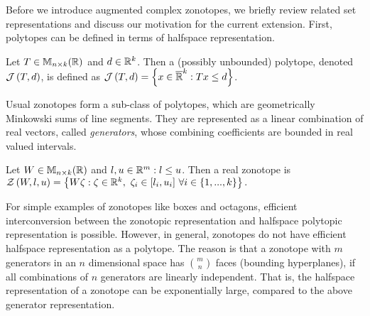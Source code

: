 
Before we introduce augmented complex zonotopes, we briefly review
related set representations and discuss our motivation for the
current extension. First, polytopes can be defined in terms of halfspace representation.
%
\begin{definition}
Let $T\in\mathbb{M}_{n\times k}(\mathbb{\mathbb{R}})$ and $d\in\mathbb{R}^k$.  Then a (possibly
unbounded) polytope, denoted $\mathcal{J}\left(T,d\right)$, is defined as
$\mathcal{J}\left(T,d\right) = \left\{x\in\mathbb{\overline{R}}^k: Tx\leq d\right\}$.
\end{definition}
%
Usual zonotopes form a sub-class of polytopes, which are geometrically
Minkowski sums of line segments. They are represented as a linear
combination of real vectors, called \emph{generators}, whose combining
coefficients are bounded in real valued intervals.
\begin{definition}
Let $W\in\mathbb{M}_{n\times k}(\mathbb{\mathbb{R}})$ and $l,u\in\mathbb{R}^m: l\leq u$.  Then 
 a real zonotope is
$\mathcal{Z}\left(W,l,u\right) = \left\{W\zeta: \zeta\in\mathbb{R}^k,~\zeta_i\in[l_i,u_i]~\forall i\in \{1,...,k\}\right\}.$
\end{definition}
%
For simple examples of zonotopes like boxes and octagons, efficient
interconversion between the zonotopic representation and halfspace
polytopic representation is possible.  However, in general, zonotopes
do not have efficient halfspace representation as a polytope.  The
reason is that a zonotope with $m$ generators in an $n$ dimensional
space has ${m}\choose{n}$ faces (bounding hyperplanes), if all
combinations of $n$ generators are linearly independent.  That is, the
halfspace representation of a zonotope can be exponentially large,
compared to the above generator representation.

